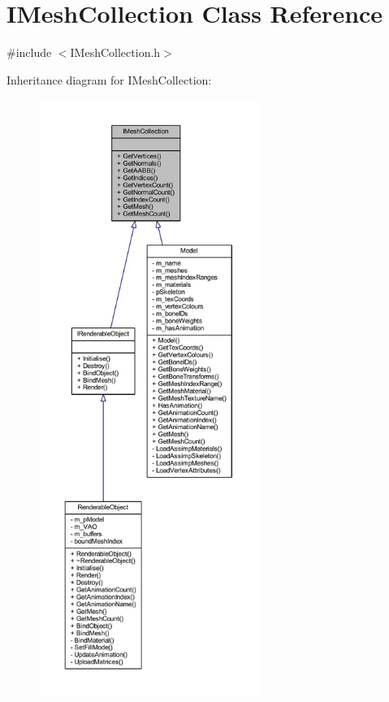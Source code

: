 \hypertarget{class_i_mesh_collection}{}\section{I\+Mesh\+Collection Class Reference}
\label{class_i_mesh_collection}


{\ttfamily \#include $<$I\+Mesh\+Collection.\+h$>$}



Inheritance diagram for I\+Mesh\+Collection\+:
\nopagebreak
\begin{figure}[H]
\begin{center}
\leavevmode
\includegraphics[height=550pt]{class_i_mesh_collection__inherit__graph}
\end{center}
\end{figure}


